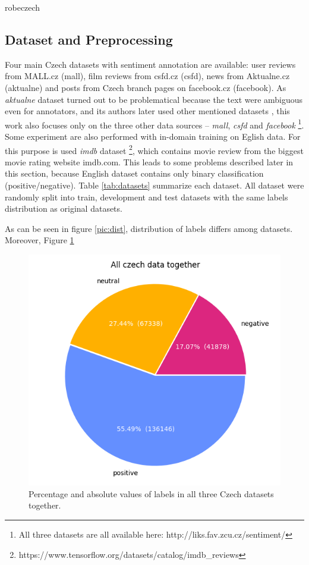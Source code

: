 

robeczech

\subsection{Dataset and Preprocessing}
Four main Czech datasets with sentiment annotation are available: user reviews from MALL.cz (mall), film reviews from csfd.cz (csfd), news from Aktualne.cz (aktualne) and posts from Czech branch pages on facebook.cz (facebook). As \textit{aktualne} dataset turned out to be problematical because the text were ambiguous even for annotators, and its authors later used other mentioned datasets \citep{Veselovska}, this work also focuses only on the three other data sources -- \textit{mall}, \textit{csfd} and \textit{facebook} \footnote{All three datasets are all available here: http://liks.fav.zcu.cz/sentiment/}. Some experiment are also performed with in-domain training on Eglish data. For this purpose is used \textit{imdb} dataset \footnote{https://www.tensorflow.org/datasets/catalog/imdb\_reviews}, which contains movie review from the biggest movie rating website imdb.com. This leads to some problems described later in this section, because English dataset contains only binary classification (positive/negative). Table \ref{tab:datasets} summarize each dataset. All dataset were randomly split into train, development and test datasets with the same labels distribution as original datasets.
\par
As can be seen in figure \ref{pic:dist}, distribution of labels differs among datasets. Moreover, Figure \ref{pic:dist_all}
\begin{figure}[!h]
\centering
\includegraphics[width=0.7\columnwidth]{../img/all.png}
\protect\caption{Percentage and absolute values of labels in all three Czech datasets together.}
\label{pic:dist_all}
\end{figure}

